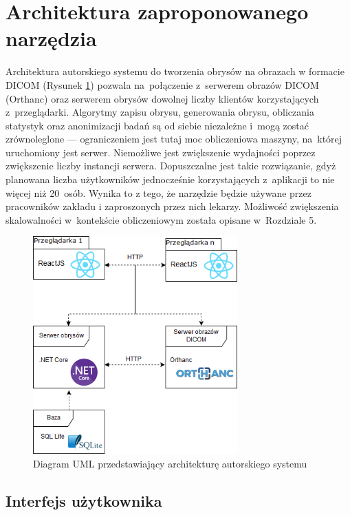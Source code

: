 \documentclass[a4paper,11pt,twoside,openright]{report}
\theoremstyle{definition}
\begin{document}
\section {Architektura zaproponowanego narzędzia}

Architektura autorskiego systemu do tworzenia obrysów na obrazach w formacie DICOM
(Rysunek \ref{fig:architektura}) pozwala na~połączenie z~serwerem obrazów DICOM (Orthanc) oraz serwerem
obrysów dowolnej liczby klientów korzystających z~przeglądarki. Algorytmy zapisu
obrysu, generowania obrysu, obliczania statystyk oraz anonimizacji badań są od
siebie niezależne i~mogą zostać zrównoleglone --- ograniczeniem jest tutaj moc
obliczeniowa maszyny, na~której uruchomiony jest serwer. Niemożliwe jest zwiększenie
wydajności poprzez zwiększenie liczby instancji serwera. Dopuszczalne jest takie
rozwiązanie, gdyż planowana liczba użytkowników jednocześnie korzystających z~aplikacji
to nie więcej niż 20~osób. Wynika to z tego, że narzędzie będzie używane przez pracowników
zakładu i zaproszonych przez nich lekarzy. Możliwość zwiększenia skalowalności w~kontekście
obliczeniowym została opisane w~Rozdziale 5.

\begin{figure}[t]
	\center
	\includegraphics[width=0.7\textwidth]{architektura}
	\caption{Diagram UML przedstawiający architekturę autorskiego systemu}
    	\label{fig:architektura}
\end{figure}

\subsection {Interfejs użytkownika}
\end{document}
